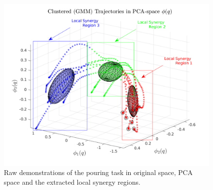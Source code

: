 \documentclass{article}
\begin{document}
\begin{figure}[!th]
\begin{minipage}{0.47\textwidth}
		\includegraphics[trim={0.8cm 0.5cm 0cm 0.35cm},clip,width=\linewidth]{../../src/JTDS_mat_lib/figures/local_synergy_regions_pour_annotated.pdf}
   \end{minipage}
   \caption{Raw demonstrations of the pouring task in original space, PCA space and the extracted local synergy regions. \label{fig:raw_demos}}
\end{figure}
\end{document}
